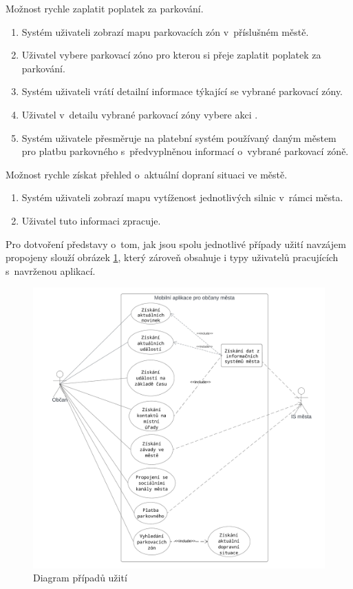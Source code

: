 Možnost rychle zaplatit poplatek za parkování.

\begin{enumerate}
  \item Systém uživateli zobrazí mapu parkovacích zón v~příslušném městě.
  \item Uživatel vybere parkovací zóno pro kterou si přeje zaplatit poplatek za parkování.
  \item Systém uživateli vrátí detailní informace týkající se vybrané parkovací zóny.
  \item Uživatel v~detailu vybrané parkovací zóny vybere akci .
  \item Systém uživatele přesměruje na platební systém používaný daným městem pro platbu parkovného s~předvyplněnou informací o~vybrané parkovací zóně.
\end{enumerate}

Možnost rychle získat přehled o~aktuální dopraní situaci ve městě.
\begin{enumerate}
  \item Systém uživateli zobrazí mapu vytíženost jednotlivých silnic v~rámci města.
  \item Uživatel tuto informaci zpracuje.
\end{enumerate}

Pro dotvoření představy o~tom, jak jsou spolu jednotlivé případy užití navzájem propojeny slouží obrázek \ref{fig:use_case_diagram}, který zároveň 
obsahuje i typy uživatelů pracujících s~navrženou aplikací.


\begin{figure}[H]
  \centering
  \includegraphics[width=.99\textwidth]{Use case diagram.png}
  \caption{Diagram případů užití}
  \label{fig:use_case_diagram}
\end{figure}

